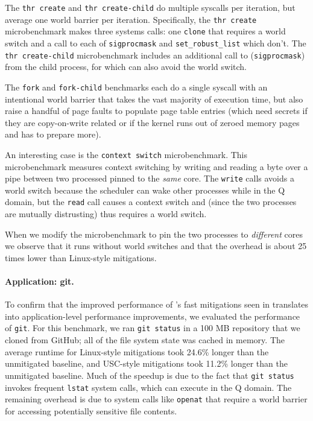 The \texttt{thr create} and \texttt{thr create-child} do multiple syscalls
per iteration, but average  one world barrier per iteration.
Specifically, the \texttt{thr create} microbenchmark makes three systems calls:
one \texttt{clone} that requires a world switch and a call to each of
\texttt{sigprocmask} and \texttt{set\_robust\_list} which don't. The
\texttt{thr create-child} microbenchmark includes an additional call to
(\texttt{sigprocmask}) from the child process, for which \sys can also
avoid the world switch.

The \texttt{fork} and \texttt{fork-child} benchmarks each do a single syscall
with an intentional world barrier that takes the vast majority of execution time,
but also raise a handful of page faults to populate page table entries (which
need secrets if they are copy-on-write related or if the kernel runs out of
zeroed memory pages and has to prepare more).

An interesting case is the \texttt{context switch} microbenchmark.
This microbenchmark measures context switching by writing and reading
a byte over a pipe between two processed pinned to the \textit{same}
core. The \texttt{write} calls avoids a world switch because the
scheduler can wake other processes while in the Q domain, but the
\texttt{read} call causes a context switch and (since the two
processes are mutually distrusting) thus requires a world switch.

When we modify the microbenchmark to pin the two processes to \textit{different}
cores we observe that it runs without world switches and that the overhead is about 25 times lower than Linux-style mitigations.




\paragraph{Application: git.}

To confirm that the improved performance of \sys's fast mitigations seen
in \bench translates into application-level performance improvements,
we evaluated the performance of \texttt{git}.  For this benchmark, we
ran \texttt{git status} in a 100 MB repository that we cloned from
GitHub; all of the file system
state was cached in memory. The average runtime for Linux-style mitigations
took 24.6\%
longer than the unmitigated baseline, and USC-style mitigations took 11.2\% longer than
the unmitigated baseline.
Much of the speedup is due to the fact that \texttt{git status} invokes
frequent \texttt{lstat} system calls, which can execute in the Q domain.
The remaining overhead is due to system calls like \texttt{openat} that
require a world barrier for accessing potentially sensitive file contents.


